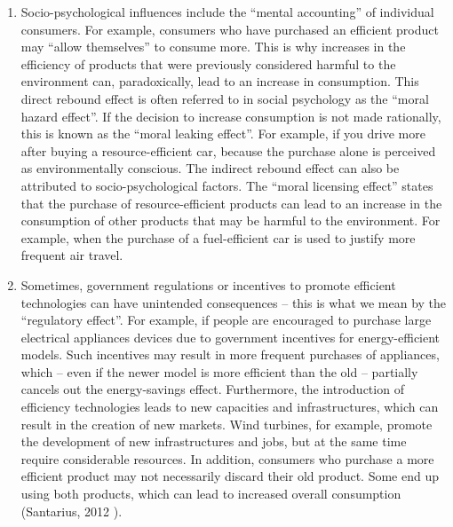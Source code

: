 \documentclass[
  a4paper,
  openany]{book}
\begin{document}
\begin{enumerate}
\def\labelenumi{\arabic{enumi}.}
\setcounter{enumi}{1}
\item
  Socio-psychological influences include the ``mental accounting'' of
  individual consumers. For example, consumers who have purchased an
  efficient product may ``allow themselves'' to consume more. This is
  why increases in the efficiency of products that were previously
  considered harmful to the environment can, paradoxically, lead to an
  increase in consumption. This direct rebound effect is often referred
  to in social psychology as the ``moral hazard effect''. If the
  decision to increase consumption is not made rationally, this is known
  as the ``moral leaking effect''. For example, if you drive more after
  buying a resource-efficient car, because the purchase alone is
  perceived as environmentally conscious. The indirect rebound effect
  can also be attributed to socio-psychological factors. The ``moral
  licensing effect'' states that the purchase of resource-efficient
  products can lead to an increase in the consumption of other products
  that may be harmful to the environment. For example, when the purchase
  of a fuel-efficient car is used to justify more frequent air travel.
\item
  Sometimes, government regulations or incentives to promote efficient
  technologies can have unintended consequences -- this is what we mean
  by the ``regulatory effect''. For example, if people are encouraged to
  purchase large electrical appliances devices due to government
  incentives for energy-efficient models. Such incentives may result in
  more frequent purchases of appliances, which -- even if the newer
  model is more efficient than the old -- partially cancels out the
  energy-savings effect. Furthermore, the introduction of efficiency
  technologies leads to new capacities and infrastructures, which can
  result in the creation of new markets. Wind turbines, for example,
  promote the development of new infrastructures and jobs, but at the
  same time require considerable resources. In addition, consumers who
  purchase a more efficient product may not necessarily discard their
  old product. Some end up using both products, which can lead to
  increased overall consumption (Santarius, 2012 ).
\end{enumerate}
\end{document}

